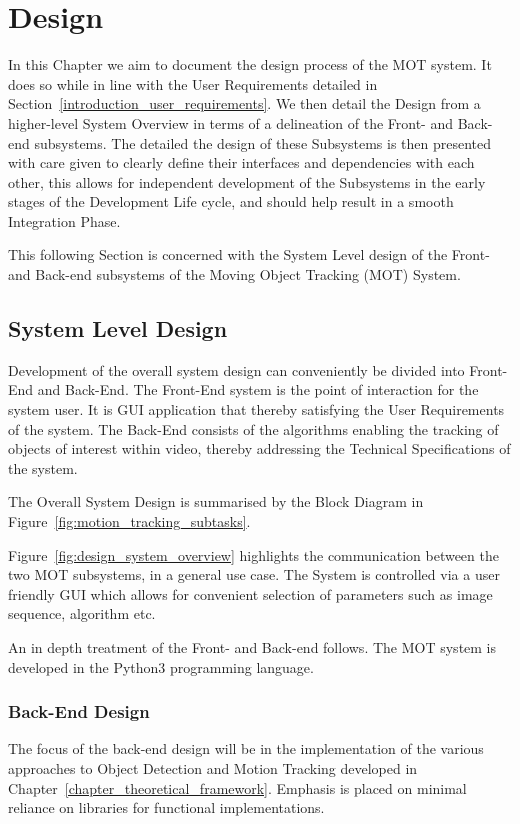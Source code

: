 \chapter{Design}\label{chapter_design}
In this Chapter we aim to document the design process of the MOT system. It does so
while in line with the User Requirements detailed in 
Section~\ref{introduction_user_requirements}. 
We then detail the Design from a higher-level System Overview in terms of a
delineation of the Front- and Back-end subsystems. The detailed the design of
these Subsystems is then presented with care given to clearly define their
interfaces and dependencies with each other, this allows for independent
development of the Subsystems in the early stages of the Development Life cycle,
and should help result in a smooth Integration Phase.

This following Section is concerned with the System Level design of the
Front- and Back-end subsystems of the Moving Object Tracking (MOT) System.

\section{System Level Design}
Development of the overall system design can conveniently be divided into
Front-End and Back-End. The Front-End system is the point of interaction for the
system user. It is GUI application that thereby satisfying the User Requirements
of the system. The Back-End consists of the algorithms enabling the tracking of
objects of interest within video, thereby addressing the Technical
Specifications of the system.

The Overall System Design is summarised by the Block Diagram in
Figure~\ref{fig:motion_tracking_subtasks}.  


Figure~\ref{fig:design_system_overview} highlights the communication between the two MOT
subsystems, in a general use case. The System is controlled via a user
friendly GUI which allows for convenient selection of parameters such as
image sequence, algorithm etc.

An in depth treatment of the Front- and Back-end follows. The MOT system is
developed in the Python3 programming language. 

\subsection{Back-End Design}\label{design_back_end}
The focus of the back-end design will be in the implementation of the various
approaches to Object Detection and Motion Tracking developed in
Chapter~\ref{chapter_theoretical_framework}.
Emphasis is placed on minimal reliance on libraries for functional
implementations.

